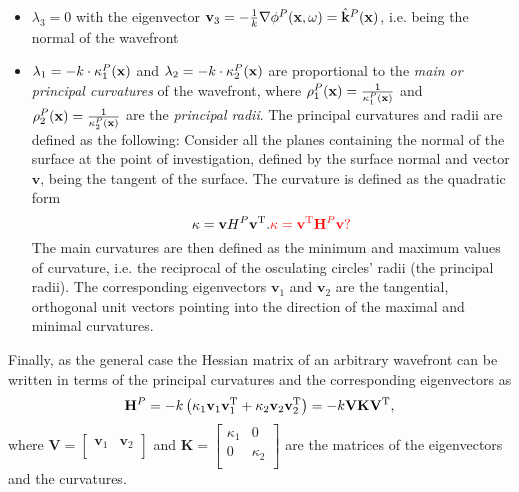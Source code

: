 \begin{itemize}
\item $\lambda_3 = 0$ with the eigenvector $\mathbf{v}_3 = - \frac{1}{k} \nabla \phi^P(\mathbf{x},\omega) = \hat{\mathbf{k}}^P(\mathbf{x})$, i.e. being the normal of the wavefront
\item $\lambda_1 = -k \cdot \kappa^P_1(\mathbf{x})$ and $\lambda_2 = -k \cdot	\kappa^P_2(\mathbf{x})$ are proportional to the \emph{main or principal curvatures} of the wavefront, where $\rho^P_1(\mathbf{x}) = \frac{1}{\kappa^P_1(\mathbf{x})}$ and $\rho^P_2(\mathbf{x}) = \frac{1}{\kappa^P_2(\mathbf{x})}$ are the \emph{principal radii}.
The principal curvatures and radii are defined as the following:
Consider all the planes containing the normal of the surface at the point of investigation, defined by the surface normal and vector $\mathbf{v}$, being the tangent of the surface.
The curvature is defined as the quadratic form 
\begin{equation}
\kappa = \mathbf{v} H^P \mathbf{v}^{\mathrm{T}}. \textcolor{red}{\kappa = \mathbf{v}^{\mathrm{T}} \mathbf{H}^P \mathbf{v} ?} 
\label{Eq:App:curvature_def}
\end{equation}
The main curvatures are then defined as the minimum and maximum values of curvature, i.e. the reciprocal of the osculating circles' radii (the principal radii).
The corresponding eigenvectors $\mathbf{v}_1$ and $\mathbf{v}_2$ are the tangential, orthogonal unit vectors pointing into the direction of the maximal and minimal curvatures.
\end{itemize}
Finally, as the general case the Hessian matrix of an arbitrary wavefront can be written in terms of the principal curvatures and the corresponding eigenvectors as
\begin{equation}
\mathbf{H}^P = -k \left( \kappa_1  \mathbf{v}_1 \mathbf{v}_1^\mathrm{T} + \kappa_2 \mathbf{v}_2 \mathbf{v}_2^\mathrm{T} \right) = -k \mathbf{V} \mathbf{K} \mathbf{V}^{\mathrm{T}},
\label{Eq:App:Hessian_w_curvature}
\end{equation}
where $\mathbf{V} = \begin{bmatrix} \mathbf{v}_1 & \mathbf{v}_2 \\\end{bmatrix}$ and $\mathbf{K} = \begin{bmatrix} \kappa_1 & 0 \\[.0em] 0 & \kappa_2 \\[0.0em] \end{bmatrix}$ are the matrices of the eigenvectors and the curvatures.

